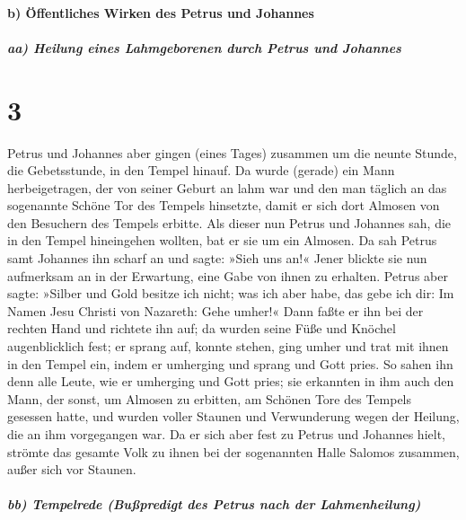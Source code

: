 \hypertarget{b-uxf6ffentliches-wirken-des-petrus-und-johannes}{%
\paragraph{b) Öffentliches Wirken des Petrus und
Johannes}\label{b-uxf6ffentliches-wirken-des-petrus-und-johannes}}

\hypertarget{aa-heilung-eines-lahmgeborenen-durch-petrus-und-johannes}{%
\subparagraph{aa) Heilung eines Lahmgeborenen durch Petrus und
Johannes}\label{aa-heilung-eines-lahmgeborenen-durch-petrus-und-johannes}}

\hypertarget{section-2}{%
\section{3}\label{section-2}}

 Petrus und Johannes aber gingen (eines Tages) zusammen um
die neunte Stunde, die Gebetsstunde, in den Tempel hinauf.
 Da wurde (gerade) ein Mann herbeigetragen, der von seiner
Geburt an lahm war und den man täglich an das sogenannte Schöne Tor des
Tempels hinsetzte, damit er sich dort Almosen von den Besuchern des
Tempels erbitte.  Als dieser nun Petrus und Johannes sah,
die in den Tempel hineingehen wollten, bat er sie um ein Almosen.
 Da sah Petrus samt Johannes ihn scharf an und sagte:
»Sieh uns an!«  Jener blickte sie nun aufmerksam an in der
Erwartung, eine Gabe von ihnen zu erhalten.  Petrus aber
sagte: »Silber und Gold besitze ich nicht; was ich aber habe, das gebe
ich dir: Im Namen Jesu Christi von Nazareth: Gehe umher!« 
Dann faßte er ihn bei der rechten Hand und richtete ihn auf; da wurden
seine Füße und Knöchel augenblicklich fest;  er sprang
auf, konnte stehen, ging umher und trat mit ihnen in den Tempel ein,
indem er umherging und sprang und Gott pries.  So sahen
ihn denn alle Leute, wie er umherging und Gott pries; 
sie erkannten in ihm auch den Mann, der sonst, um Almosen zu erbitten,
am Schönen Tore des Tempels gesessen hatte, und wurden voller Staunen
und Verwunderung wegen der Heilung, die an ihm vorgegangen war.
 Da er sich aber fest zu Petrus und Johannes hielt,
strömte das gesamte Volk zu ihnen bei der sogenannten Halle Salomos
zusammen, außer sich vor Staunen.

\hypertarget{bb-tempelrede-buuxdfpredigt-des-petrus-nach-der-lahmenheilung}{%
\subparagraph{bb) Tempelrede (Bußpredigt des Petrus nach der
Lahmenheilung)}\label{bb-tempelrede-buuxdfpredigt-des-petrus-nach-der-lahmenheilung}}

